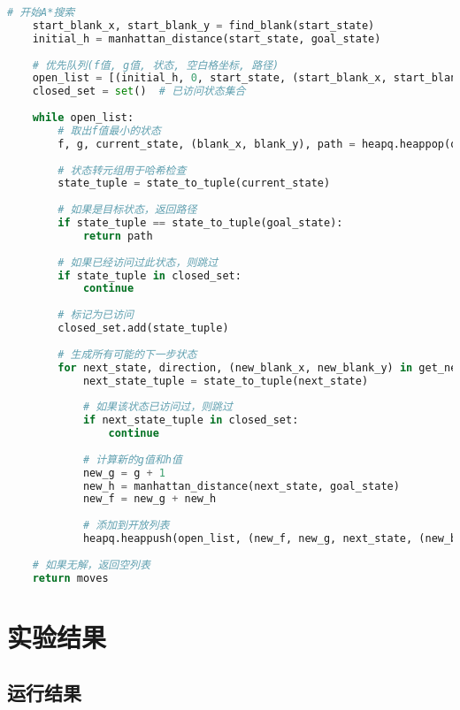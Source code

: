 \documentclass[a4paper,12pt]{article}
\begin{document}
\begin{lstlisting}[language=Python, caption=A*算法代码示例]
    # 开始A*搜索
    start_blank_x, start_blank_y = find_blank(start_state)
    initial_h = manhattan_distance(start_state, goal_state)
    
    # 优先队列(f值, g值, 状态, 空白格坐标, 路径)
    open_list = [(initial_h, 0, start_state, (start_blank_x, start_blank_y), [])]
    closed_set = set()  # 已访问状态集合
    
    while open_list:
        # 取出f值最小的状态
        f, g, current_state, (blank_x, blank_y), path = heapq.heappop(open_list)
        
        # 状态转元组用于哈希检查
        state_tuple = state_to_tuple(current_state)
        
        # 如果是目标状态，返回路径
        if state_tuple == state_to_tuple(goal_state):
            return path
        
        # 如果已经访问过此状态，则跳过
        if state_tuple in closed_set:
            continue
        
        # 标记为已访问
        closed_set.add(state_tuple)
        
        # 生成所有可能的下一步状态
        for next_state, direction, (new_blank_x, new_blank_y) in get_next_states(current_state, blank_x, blank_y):
            next_state_tuple = state_to_tuple(next_state)
            
            # 如果该状态已访问过，则跳过
            if next_state_tuple in closed_set:
                continue
            
            # 计算新的g值和h值
            new_g = g + 1
            new_h = manhattan_distance(next_state, goal_state)
            new_f = new_g + new_h
            
            # 添加到开放列表
            heapq.heappush(open_list, (new_f, new_g, next_state, (new_blank_x, new_blank_y), path + [direction]))
    
    # 如果无解，返回空列表
    return moves
\end{lstlisting}


\section{实验结果}
\subsection{运行结果}
\end{document}
